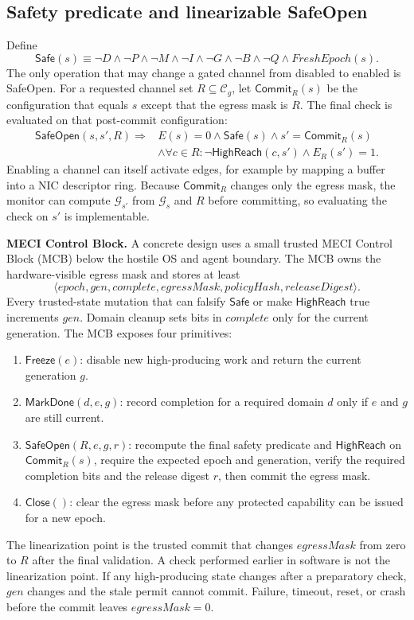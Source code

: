 \documentclass[11pt,letterpaper]{article}
\theoremstyle{plain}
\theoremstyle{definition}
\newcommand{\HR}{\mathsf{HighReach}}
\newcommand{\SafeOpen}{\mathsf{SafeOpen}}
\newcommand{\Safe}{\mathsf{Safe}}
\newcommand{\Commit}{\mathsf{Commit}}
\newcommand{\Cg}{\mathcal{C}_g}
\newcommand{\Gs}{\mathcal{G}}
\begin{document}
\subsection{Safety predicate and linearizable SafeOpen}
Define
\begin{equation}\label{eq:safe}
\Safe(s) \equiv \neg D \wedge \neg P \wedge \neg M \wedge \neg I \wedge \neg G \wedge \neg B \wedge \neg Q \wedge \mathit{FreshEpoch}(s).
\end{equation}
The only operation that may change a gated channel from disabled to enabled is SafeOpen. For a requested channel set $R \subseteq \Cg$, let $\Commit_R(s)$ be the configuration that equals $s$ except that the egress mask is $R$. The final check is evaluated on that post-commit configuration:
\begin{align}
\SafeOpen(s, s', R) \Rightarrow{}& E(s) = 0 \wedge \Safe(s) \wedge s' = \Commit_R(s) \label{eq:so1}\\
&\wedge \forall c \in R : \neg\HR(c, s') \wedge E_R(s') = 1. \label{eq:so2}
\end{align}
Enabling a channel can itself activate edges, for example by mapping a buffer into a NIC descriptor ring. Because $\Commit_R$ changes only the egress mask, the monitor can compute $\Gs_{s'}$ from $\Gs_s$ and $R$ before committing, so evaluating the check on $s'$ is implementable.

\textbf{MECI Control Block.} A concrete design uses a small trusted MECI Control Block (MCB) below the hostile OS and agent boundary. The MCB owns the hardware-visible egress mask and stores at least
\begin{equation}
\langle \mathit{epoch}, \mathit{gen}, \mathit{complete}, \mathit{egressMask}, \mathit{policyHash}, \mathit{releaseDigest}\rangle.
\end{equation}
Every trusted-state mutation that can falsify $\Safe$ or make $\HR$ true increments $\mathit{gen}$. Domain cleanup sets bits in $\mathit{complete}$ only for the current generation. The MCB exposes four primitives:
\begin{enumerate}[leftmargin=*,itemsep=1pt]
\item $\mathsf{Freeze}(e)$: disable new high-producing work and return the current generation $g$.
\item $\mathsf{MarkDone}(d,e,g)$: record completion for a required domain $d$ only if $e$ and $g$ are still current.
\item $\SafeOpen(R,e,g,r)$: recompute the final safety predicate and $\HR$ on $\Commit_R(s)$, require the expected epoch and generation, verify the required completion bits and the release digest $r$, then commit the egress mask.
\item $\mathsf{Close}()$: clear the egress mask before any protected capability can be issued for a new epoch.
\end{enumerate}
The linearization point is the trusted commit that changes $\mathit{egressMask}$ from zero to $R$ after the final validation. A check performed earlier in software is not the linearization point. If any high-producing state changes after a preparatory check, $\mathit{gen}$ changes and the stale permit cannot commit. Failure, timeout, reset, or crash before the commit leaves $\mathit{egressMask} = 0$.
\end{document}
